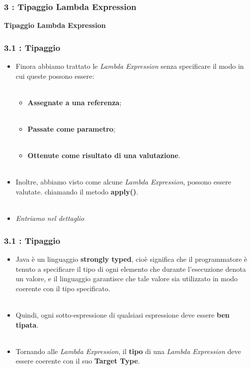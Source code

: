 \documentclass{beamer}
\begin{document}

\begin{frame}
	\frametitle{\textbf{3 : Tipaggio Lambda Expression}}
	\begin{center}
		\textbf{\Huge Tipaggio Lambda Expression}
	\end{center}
\end{frame}


\begin{frame}
	\frametitle{\textbf{3.1 : Tipaggio}}
	\begin{itemize}
		\item 
			Finora abbiamo trattato le \textit{Lambda Expression} senza specificare il modo in cui queste possono essere:\\\ 
			\begin{itemize}
				\item
					\textbf{Assegnate a una referenza};\\\
				\item
					\textbf{Passate come parametro};\\\
				\item
					\textbf{Ottenute come risultato di una valutazione}.\\\	
			\end{itemize}
		\item 
			Inoltre, abbiamo visto come alcune \textit{Lambda Expression}, possono essere valutate. chiamando il metodo \textbf{apply()}.\\\
		\item 
			\textit{Entriamo nel dettaglio}
	\end{itemize}
\end{frame}


\begin{frame}
	\frametitle{\textbf{3.1 : Tipaggio}}
	\begin{itemize}
		\item 
			Java è un linguaggio \textbf{strongly typed}, cioè significa che il programmatore è tenuto a specificare il tipo di ogni elemento che durante l'esecuzione denota un valore, e il linguaggio garantisce che tale valore sia utilizzato in modo coerente con il tipo specificato.\\\
		\item 
			Quindi, ogni sotto-espressione di qualsiasi espressione deve essere \textbf{ben tipata}.\\\
		\item 
			Tornando alle \textit{Lambda Expression}, il \textbf{tipo} di una \textit{Lambda Expression} deve essere coerente con il suo \textbf{Target Type}.
	\end{itemize}
\end{frame}
\end{document}
